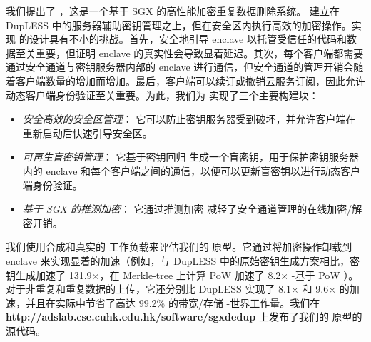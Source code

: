 我们提出了 \sysname，这是一个基于 SGX 的高性能加密重复数据删除系统。 \sysname 建立在 DupLESS \cite{bellare13b} 中的服务器辅助密钥管理之上，但在安全区内执行高效的加密操作。实现 \sysname 的设计具有不小的挑战。首先，安全地引导 enclave 以托管受信任的代码和数据至关重要，但证明 enclave 的真实性会导致显着延迟。其次，每个客户端都需要通过安全通道与密钥服务器内部的 enclave 进行通信，但安全通道的管理开销会随着客户端数量的增加而增加。最后，客户端可以续订或撤销云服务订阅，因此允许动态客户端身份验证至关重要。为此，我们为 \sysname 实现了三个主要构建块： 

\begin{itemize}[leftmargin=*]
    \item {\em 安全高效的安全区管理}：
        它可以防止密钥服务器受到破坏，并允许客户端在重新启动后快速引导安全区。
    \item {\em 可再生盲密钥管理}：
        它基于密钥回归 \cite{fu06} 生成一个盲密钥，用于保护密钥服务器内的 enclave 和每个客户端之间的通信，以便可以更新盲密钥以进行动态客户端身份验证。
    \item {\em 基于 SGX 的推测加密}：
        它通过推测加密 \cite{eduardo19} 减轻了安全通道管理的在线加密/解密开销。
\end{itemize}

我们使用合成和真实的 \cite{fsl,meyer11} 工作负载来评估我们的 \sysname 原型。它通过将加密操作卸载到 enclave 来实现显着的加速（例如，与 DupLESS \cite{bellare13b} 中的原始密钥生成方案相比，密钥生成加速了 131.9$\times$，在 Merkle-tree 上计算 PoW 加速了 8.2$\times$ -基于 PoW \cite{halevi11}）。对于非重复和重复数据的上传，它还分别比 DupLESS \cite{bellare13b} 实现了 8.1$\times$ 和 9.6$\times$ 的加速，并且在实际中节省了高达 99.2\% 的带宽/存储 -世界工作量。我们在 {\bf http://adslab.cse.cuhk.edu.hk/software/sgxdedup} 上发布了我们的 \sysname 原型的源代码。 

